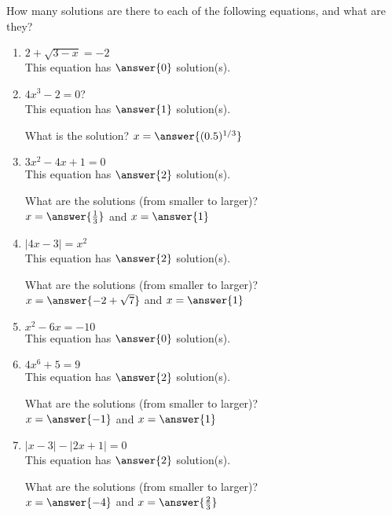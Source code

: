 \documentclass{ximera}
\author{Elizabeth Campolongo}
\begin{document}
\begin{exercise}
How many solutions are there to each of the following equations, and what are they?
\begin{enumerate}
\item $2+\sqrt{3-x}=-2$ \\
This equation has $\answer{0}$ solution(s).
%
\item $4x^3-2=0$? \\
This equation has $\answer{1}$ solution(s).
%
\begin{exercise}
What is the solution?
$x=\answer{(0.5)^{1/3}}$
\end{exercise}

\item $3x^2-4x+1=0$ \\
This equation has $\answer{2}$ solution(s).
\begin{exercise}
What are the solutions (from smaller to larger)?\\
$x=\answer{\frac{1}{3}}$ and $x=\answer{1}$
\end{exercise}

\item $|4x-3|=x^2$ \\
This equation has $\answer{2}$ solution(s).
\begin{exercise}
What are the solutions (from smaller to larger)?\\
$x=\answer{-2+\sqrt{7}}$ and $x=\answer{1}$
\end{exercise}

\item $x^2-6x=-10$ \\
This equation has $\answer{0}$ solution(s).


\item $4x^6+5=9$ \\
This equation has $\answer{2}$ solution(s).
\begin{exercise}
What are the solutions (from smaller to larger)?\\
$x=\answer{-1}$ and $x=\answer{1}$
\end{exercise}

\item $|x-3|-|2x+1|=0$ \\
This equation has $\answer{2}$ solution(s).
\begin{exercise}
What are the solutions (from smaller to larger)?\\
$x=\answer{-4}$ and $x=\answer{\frac{2}{3}}$
\end{exercise}


\end{enumerate}
\end{exercise}
\end{document}
